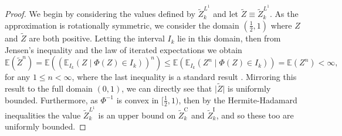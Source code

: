 \documentclass[manuscript,review]{acmart}
\begin{document}
\begin{proof}
We begin by considering the values defined by $ \widetilde{Z}_k^{L^1} $ and let $ \widetilde{Z} \equiv  \widetilde{Z}_k^{L^1}$. As the approximation is rotationally symmetric, we consider the domain $ (\tfrac{1}{2}, 1) $ where $ Z $ and $ \widetilde{Z} $ are both positive. Letting the interval $ I_k $ lie in this domain, then from Jensen's inequality and the law of iterated expectations we obtain 
\begin{equation*}
\mathbb{E}(\widetilde{Z}^n) = \mathbb{E}((\mathbb{E}_{I_k}(Z \mid \Phi(Z) \in I_k))^n) \leq \mathbb{E}(\mathbb{E}_{I_k}(Z^n \mid \Phi(Z) \in I_k)) =  \mathbb{E}(Z^n) < \infty,
\end{equation*}
for any $ 1\leq n < \infty $, where the last inequality is a standard result \citep[appendix~C.2]{blundell2014concepts}. Mirroring this result to the full domain $ (0, 1) $, we can directly see that $ \lvert \widetilde{Z} \rvert $ is uniformly bounded. Furthermore, as $ \Phi^{-1} $ is convex in $ [\tfrac{1}{2}, 1) $, then by the Hermite-Hadamard inequalities the value $ \widetilde{Z}_k^{L^1} $ is an upper bound on $ \widetilde{Z}_k^\mathrm{C} $ and $ \widetilde{Z}_k^\mathrm{I} $, and so these too are uniformly bounded. 


\end{proof}
\end{document}

